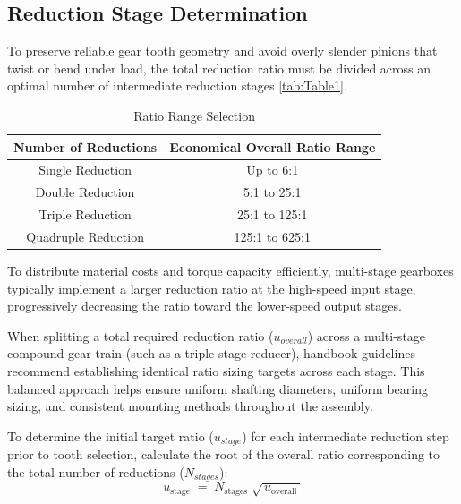 	\subsection{Reduction Stage Determination}
		To preserve reliable gear tooth geometry and avoid overly slender pinions that twist or bend under load, the total 
		reduction ratio must be divided across an optimal number of intermediate reduction stages \autoref{tab:Table1}. 
			\begin{table}[ht]
				\renewcommand{\arraystretch}{1.5}
				\centering
				\caption{Ratio Range Selection}
				\label{tab:Table1}
				\small
				\begin{tabular}{|c|c|}
					\hline
        			\textbf{Number of Reductions} & \textbf{Economical Overall Ratio Range} \\					
					\hline
					Single Reduction   & Up to 6:1  \\
					\hline
					Double Reduction   & 5:1 to 25:1  \\
					\hline
					Triple Reduction   & 25:1 to 125:1  \\
					\hline
					Quadruple Reduction   & 125:1 to 625:1  \\
					\hline
				\end{tabular}
			\end{table}

		To distribute material costs and torque capacity efficiently, multi-stage gearboxes typically implement a larger reduction 
		ratio at the high-speed input stage, progressively decreasing the ratio toward the lower-speed output stages. 

		When splitting a total required reduction ratio ($u_{overall}$) across a multi-stage compound gear 
		train (such as a triple-stage reducer), handbook guidelines recommend establishing identical ratio sizing targets 
		across each stage. This balanced approach helps ensure uniform shafting diameters, uniform bearing sizing, and consistent 
		mounting methods throughout the assembly. 

		To determine the initial target ratio ($u_{stage}$) for each intermediate reduction step prior to tooth selection, 
		calculate the root of the overall ratio corresponding to the total number of reductions ($N_{stages}$):
			\begin{equation}
				\label{eq:initialtargetratio}
				u_{\text{stage}}
				\;=\;
				N_{\text{stages}}\;\sqrt{\,u_{\text{overall}}\,}
			\end{equation}

